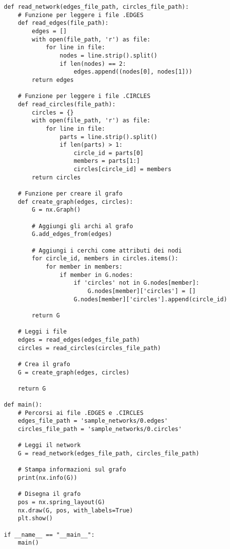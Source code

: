 \begin{code}
\begin{verbatim}
def read_network(edges_file_path, circles_file_path):
    # Funzione per leggere i file .EDGES
    def read_edges(file_path):
        edges = []
        with open(file_path, 'r') as file:
            for line in file:
                nodes = line.strip().split()
                if len(nodes) == 2:
                    edges.append((nodes[0], nodes[1]))
        return edges

    # Funzione per leggere i file .CIRCLES
    def read_circles(file_path):
        circles = {}
        with open(file_path, 'r') as file:
            for line in file:
                parts = line.strip().split()
                if len(parts) > 1:
                    circle_id = parts[0]
                    members = parts[1:]
                    circles[circle_id] = members
        return circles

    # Funzione per creare il grafo
    def create_graph(edges, circles):
        G = nx.Graph()

        # Aggiungi gli archi al grafo
        G.add_edges_from(edges)

        # Aggiungi i cerchi come attributi dei nodi
        for circle_id, members in circles.items():
            for member in members:
                if member in G.nodes:
                    if 'circles' not in G.nodes[member]:
                        G.nodes[member]['circles'] = []
                    G.nodes[member]['circles'].append(circle_id)

        return G

    # Leggi i file
    edges = read_edges(edges_file_path)
    circles = read_circles(circles_file_path)

    # Crea il grafo
    G = create_graph(edges, circles)

    return G

def main():
    # Percorsi ai file .EDGES e .CIRCLES
    edges_file_path = 'sample_networks/0.edges'
    circles_file_path = 'sample_networks/0.circles'

    # Leggi il network
    G = read_network(edges_file_path, circles_file_path)

    # Stampa informazioni sul grafo
    print(nx.info(G))

    # Disegna il grafo
    pos = nx.spring_layout(G)
    nx.draw(G, pos, with_labels=True)
    plt.show()

if __name__ == "__main__":
    main()
\end{verbatim}
\end{code}

